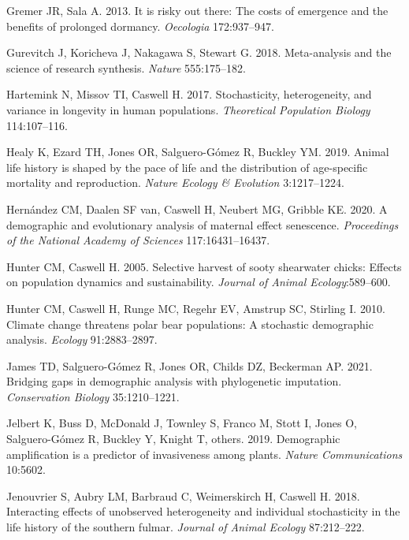 \documentclass[
  12pt,
  letterpaper,
]{book}
\newlength{\cslhangindent}
\newenvironment{CSLReferences}[2] %
 {\begin{list}{}{%
  \setlength{\itemindent}{0pt}
  \setlength{\leftmargin}{0pt}
  \setlength{\parsep}{0pt}
  \ifodd #1
   \setlength{\leftmargin}{\cslhangindent}
   \setlength{\itemindent}{-1\cslhangindent}
  \fi
  \setlength{\itemsep}{#2\baselineskip}}}
 {\end{list}}
\begin{document}
\begin{CSLReferences}{1}{0}
Gremer JR, Sala A. 2013. It is risky out there: The costs of emergence
and the benefits of prolonged dormancy. \emph{Oecologia} 172:937--947.

Gurevitch J, Koricheva J, Nakagawa S, Stewart G. 2018. Meta-analysis and
the science of research synthesis. \emph{Nature} 555:175--182.

Hartemink N, Missov TI, Caswell H. 2017. Stochasticity, heterogeneity,
and variance in longevity in human populations. \emph{Theoretical
Population Biology} 114:107--116.

Healy K, Ezard TH, Jones OR, Salguero-Gómez R, Buckley YM. 2019. Animal
life history is shaped by the pace of life and the distribution of
age-specific mortality and reproduction. \emph{Nature Ecology \&
Evolution} 3:1217--1224.

Hernández CM, Daalen SF van, Caswell H, Neubert MG, Gribble KE. 2020. A
demographic and evolutionary analysis of maternal effect senescence.
\emph{Proceedings of the National Academy of Sciences} 117:16431--16437.

Hunter CM, Caswell H. 2005. Selective harvest of sooty shearwater
chicks: Effects on population dynamics and sustainability. \emph{Journal
of Animal Ecology}:589--600.

Hunter CM, Caswell H, Runge MC, Regehr EV, Amstrup SC, Stirling I. 2010.
Climate change threatens polar bear populations: A stochastic
demographic analysis. \emph{Ecology} 91:2883--2897.

James TD, Salguero-Gómez R, Jones OR, Childs DZ, Beckerman AP. 2021.
Bridging gaps in demographic analysis with phylogenetic imputation.
\emph{Conservation Biology} 35:1210--1221.

Jelbert K, Buss D, McDonald J, Townley S, Franco M, Stott I, Jones O,
Salguero-Gómez R, Buckley Y, Knight T, others. 2019. Demographic
amplification is a predictor of invasiveness among plants. \emph{Nature
Communications} 10:5602.

Jenouvrier S, Aubry LM, Barbraud C, Weimerskirch H, Caswell H. 2018.
Interacting effects of unobserved heterogeneity and individual
stochasticity in the life history of the southern fulmar. \emph{Journal
of Animal Ecology} 87:212--222.


\end{CSLReferences}
\end{document}
